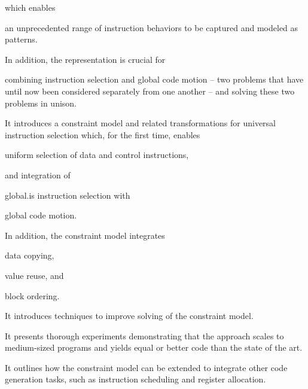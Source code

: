 \begin{contributions}
\begin{contributions}
    \end{contributions}
    which enables
    \begin{contributions}[resume]
      \item {}
        an unprecedented range of instruction behaviors to be captured and
        modeled as \glspl{pattern}.
    \end{contributions}
    In addition, the representation is crucial for
    \begin{contributions}[resume]
      \item {}
        combining \gls{instruction selection} and \gls{global code motion} --
        two problems that have until now been considered separately from one
        another -- and solving these two problems in unison.
    \end{contributions}
  \item {}
    It introduces a \gls{constraint model} and related transformations for
    \gls{universal instruction selection} which, for the first time, enables
    \begin{contributions}
      \item {}
        uniform selection of data and control \glspl{instruction},
    \end{contributions}
    and integration of
    \begin{contributions}[resume]
      \item {}
        \gls{global.is} \gls{instruction selection} with
      \item {}
        \gls{global code motion}.
    \end{contributions}
    In addition, the \gls{constraint model} integrates
    \begin{contributions}[resume]
      \item {}
        \gls{data copying},
      \item {}
        \gls{value reuse}, and
      \item {}
        \gls{block ordering}.
    \end{contributions}
  \item {}
    It introduces techniques to improve solving of the \gls{constraint model}.
  \item {}
    It presents thorough experiments demonstrating that the approach scales to
    medium-sized \glspl{program} and yields equal or better code than the state
    of the art.
  \item {}
    It outlines how the \gls{constraint model} can be extended to integrate
    other \gls{code generation} tasks, such as \gls{instruction scheduling} and
    \gls{register allocation}.
\end{contributions}

